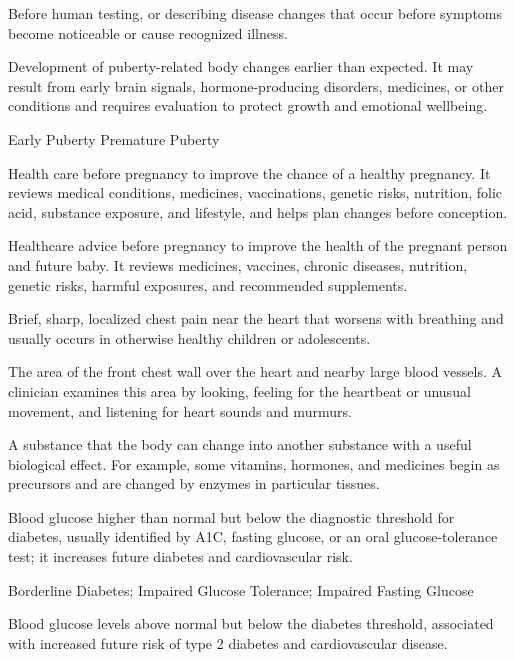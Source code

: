  Before human testing, or describing disease changes that occur before symptoms become noticeable or cause recognized illness.

 Development of puberty-related body changes earlier than expected. It may result from early brain signals, hormone-producing disorders, medicines, or other conditions and requires evaluation to protect growth and emotional wellbeing.

\synonyms
Early Puberty
Premature Puberty

 Health care before pregnancy to improve the chance of a healthy pregnancy. It reviews medical conditions, medicines, vaccinations, genetic risks, nutrition, folic acid, substance exposure, and lifestyle, and helps plan changes before conception.

 Healthcare advice before pregnancy to improve the health of the pregnant person and future baby. It reviews medicines, vaccines, chronic diseases, nutrition, genetic risks, harmful exposures, and recommended supplements.

 Brief, sharp, localized chest pain near the heart that worsens with breathing and usually occurs in otherwise healthy children or adolescents.

 The area of the front chest wall over the heart and nearby large blood vessels. A clinician examines this area by looking, feeling for the heartbeat or unusual movement, and listening for heart sounds and murmurs.

 A substance that the body can change into another substance with a useful biological effect. For example, some vitamins, hormones, and medicines begin as precursors and are changed by enzymes in particular tissues.

 Blood glucose higher than normal but below the diagnostic threshold for diabetes, usually identified by A1C, fasting glucose, or an oral glucose-tolerance test; it increases future diabetes and cardiovascular risk.

\synonyms
Borderline Diabetes; Impaired Glucose Tolerance; Impaired Fasting Glucose

 Blood glucose levels above normal but below the diabetes threshold, associated with increased future risk of type 2 diabetes and cardiovascular disease.

